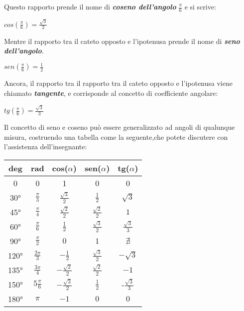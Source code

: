 Questo rapporto prende il nome di {\bf \slshape coseno dell'angolo} $\frac \pi 6$ e si scrive:
\begin{center}
\begin{math}
cos(\frac \pi 6) = \frac {\sqrt 3} 2
\end{math}
\end{center}
Mentre il rapporto tra il cateto opposto e l'ipotenusa prende il nome di {\bfseries \slshape seno dell'angolo}.
\begin{center}
\begin{math}
sen(\frac \pi 6) = \frac 1 2
\end{math}
\end{center}
Ancora, il rapporto tra il rapporto tra il cateto opposto e l'ipotenusa viene chiamato {\bf \slshape tangente}, e corrisponde al concetto di coefficiente angolare:
\begin{center}
\begin{math}
tg(\frac \pi 6) = \frac {\sqrt 3} 3
\end{math}
\end{center}
Il concetto di seno e coseno può essere generalizzato ad angoli di qualunque misura, costruendo una tabella come la seguente,che potete discutere con l'assistenza dell'insegnante:\newline
\begin{center}
\begin{tabular}{|c|c|c|c|c|}
\hline
deg & rad & cos($\alpha$) & sen($\alpha$) & tg($\alpha$) \\
\hline
0 & 0 & 1 & 0 & 0 \\
\hline
30° & $\frac \pi 3$ & $\frac {\sqrt 3} 2$ & $\frac 1 2$ & $\sqrt 3$ \\
\hline
45° & $\frac \pi 4$ & $\frac {\sqrt 2} 2$ & $\frac {\sqrt 2} 2$ & $1$ \\
\hline
60° & $\frac \pi 6$ & $\frac 1 2$ & $\frac {\sqrt 3} 2$ & $\frac {\sqrt 3} 3$ \\
\hline
90° & $\frac \pi 2$ & $0$ & $1$ & $\nexists$ \\
\hline
120° & $\frac {2 \pi} 3$ & $-\frac 1 2$ & $\frac {\sqrt 3} {2}$ & $-\sqrt 3$ \\
\hline
135° & $\frac {3 \pi} 4$ & $-\frac {\sqrt 2} 2$ & $\frac {\sqrt 2} {2}$ & $-1$ \\
\hline
150° & $5 \frac \pi 6$ & $-\frac {\sqrt 3} 2$ & $\frac 1 2$ & -$\frac {\sqrt 3} {3}$ \\
\hline
180° & $\pi $ & $-1$ & $0$ & $0$ \\
\hline
\end{tabular}
\end{center}

